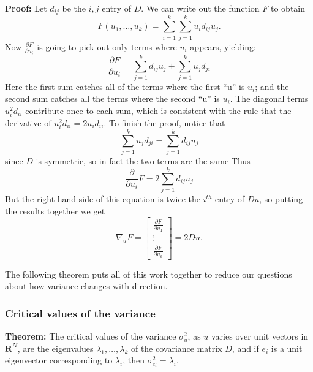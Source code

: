 \documentclass[
]{article}
\begin{document}
\textbf{Proof:} Let \(d_{ij}\) be the \(i,j\) entry of \(D\). We can
write out the function \(F\) to obtain \[
F(u_1,\ldots, u_{k}) = \sum_{i=1}^{k} \sum_{j=1}^{k} u_i d_{ij} u_j.
\] Now \(\frac{\partial F}{\partial u_{i}}\) is going to pick out only
terms where \(u_{i}\) appears, yielding: \[
\frac{\partial F}{\partial u_{i}} = \sum_{j=1}^{k} d_{ij}u_{j} + \sum_{j=1}^{k} u_{j}d_{ji}
\] Here the first sum catches all of the terms where the first ``u'' is
\(u_{i}\); and the second sum catches all the terms where the second
``u'' is \(u_{i}\). The diagonal terms \(u_{i}^2d_{ii}\) contribute once
to each sum, which is consistent with the rule that the derivative of
\(u_{i}^2d_{ii} = 2u_{i}d_{ii}\). To finish the proof, notice that \[
\sum_{j=1}^{k} u_{j}d_{ji} = \sum_{j=1}^{k} d_{ij}u_{j} 
\] since \(D\) is symmetric, so in fact the two terms are the same Thus
\[
\frac{\partial}{\partial u_{i}}F = 2\sum_{j=1}^{k} d_{ij}u_{j}
\] But the right hand side of this equation is twice the \(i^{th}\)
entry of \(Du\), so putting the results together we get \[
\nabla_{u}F = \left[\begin{matrix} \frac{\partial F}{\partial u_{1}} \\ \vdots \\ \frac{\partial F}{\partial u_{k}}\end{matrix}\right] = 2Du.
\]

The following theorem puts all of this work together to reduce our
questions about how variance changes with direction.

\hypertarget{sec:critvals}{%
\subsubsection{Critical values of the variance}\label{sec:critvals}}

\textbf{Theorem:} The critical values of the variance \(\sigma_{u}^2\),
as \(u\) varies over unit vectors in \(\mathbf{R}^{N}\), are the
eigenvalues \(\lambda_{1},\ldots,\lambda_{k}\) of the covariance matrix
\(D\), and if \(e_{i}\) is a unit eigenvector corresponding to
\(\lambda_{i}\), then \(\sigma_{e_{i}}^2 = \lambda_{i}\).
\end{document}
